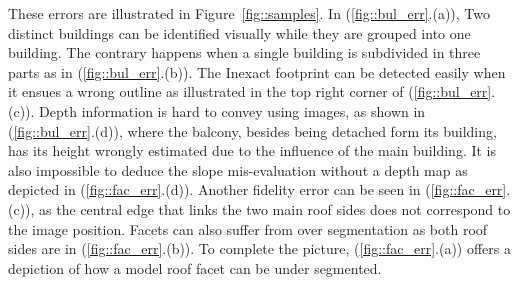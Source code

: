 \documentclass[runningheads]{llncs}
\begin{document}
These errors are illustrated in Figure~\ref{fig::samples}. In (\ref{fig::bul_err}.(a)), Two distinct buildings can be identified visually while they are grouped into one building. The contrary happens when a single building is subdivided in three parts as in (\ref{fig::bul_err}.(b)). The Inexact footprint can be detected easily when it ensues a wrong outline as illustrated in the top right corner of (\ref{fig::bul_err}.(c)). Depth information is hard to convey using images, as shown in (\ref{fig::bul_err}.(d)), where the balcony, besides being detached form its building, has its height wrongly estimated due to the influence of the main building. It is also impossible to deduce the slope mis-evaluation without a depth map as depicted in (\ref{fig::fac_err}.(d)). Another fidelity error can be seen in (\ref{fig::fac_err}.(c)), as the central edge that links the two main roof sides does not correspond to the image position. Facets can also suffer from over segmentation as both roof sides are in (\ref{fig::fac_err}.(b)). To complete the picture, (\ref{fig::fac_err}.(a)) offers a depiction of how a model roof facet can be under segmented.
\end{document}
